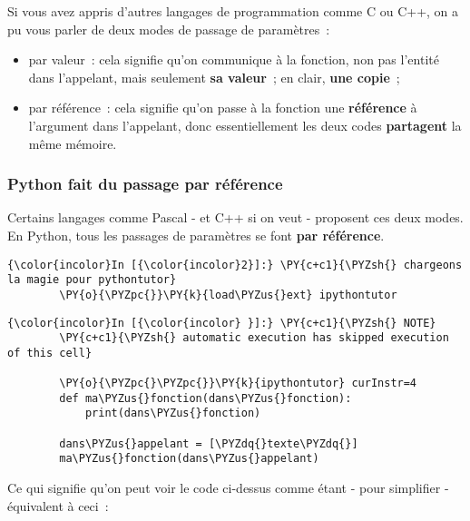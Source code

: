     Si vous avez appris d'autres langages de programmation comme C ou C++,
on a pu vous parler de deux modes de passage de paramètres~:

\begin{itemize}
\tightlist
\item
  par valeur~: cela signifie qu'on communique à la fonction, non pas
  l'entité dans l'appelant, mais seulement \textbf{sa valeur}~; en
  clair, \textbf{une copie}~;
\item
  par référence~: cela signifie qu'on passe à la fonction une
  \textbf{référence} à l'argument dans l'appelant, donc essentiellement
  les deux codes \textbf{partagent} la même mémoire.
\end{itemize}

    \hypertarget{python-fait-du-passage-par-ruxe9fuxe9rence}{%
\subsubsection{Python fait du passage par
référence}\label{python-fait-du-passage-par-ruxe9fuxe9rence}}

    Certains langages comme Pascal - et C++ si on veut - proposent ces deux
modes. En Python, tous les passages de paramètres se font \textbf{par
référence}.

    \begin{Verbatim}[commandchars=\\\{\}]
{\color{incolor}In [{\color{incolor}2}]:} \PY{c+c1}{\PYZsh{} chargeons la magie pour pythontutor}
        \PY{o}{\PYZpc{}}\PY{k}{load\PYZus{}ext} ipythontutor
\end{Verbatim}


    \begin{Verbatim}[commandchars=\\\{\}]
{\color{incolor}In [{\color{incolor} }]:} \PY{c+c1}{\PYZsh{} NOTE}
        \PY{c+c1}{\PYZsh{} automatic execution has skipped execution of this cell}
        
        \PY{o}{\PYZpc{}\PYZpc{}}\PY{k}{ipythontutor} curInstr=4
        def ma\PYZus{}fonction(dans\PYZus{}fonction):
            print(dans\PYZus{}fonction)
            
        dans\PYZus{}appelant = [\PYZdq{}texte\PYZdq{}]
        ma\PYZus{}fonction(dans\PYZus{}appelant)
\end{Verbatim}


    Ce qui signifie qu'on peut voir le code ci-dessus comme étant - pour
simplifier - équivalent à ceci~:

